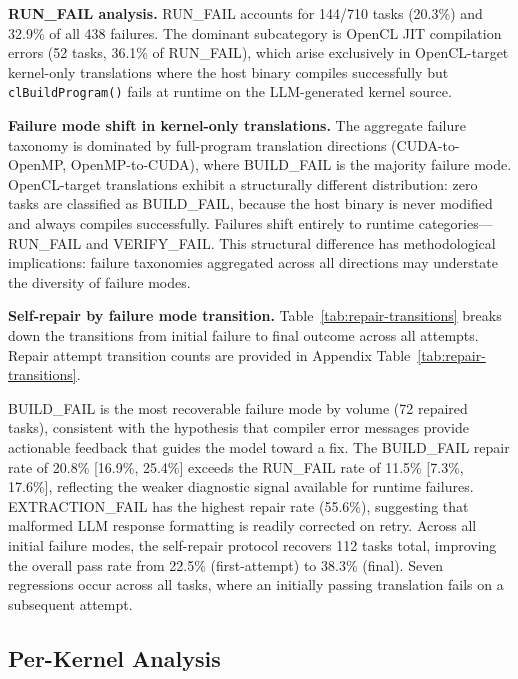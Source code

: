 \documentclass{article}
\newcommand{\buildfail}{\textsc{BUILD\_FAIL}}
\newcommand{\runfail}{\textsc{RUN\_FAIL}}
\newcommand{\verifyfail}{\textsc{VERIFY\_FAIL}}
\newcommand{\extractionfail}{\textsc{EXTRACTION\_FAIL}}
\begin{document}
\textbf{\runfail{} analysis.} \runfail{} accounts for 144/710 tasks (20.3\%) and 32.9\% of all 438 failures. The dominant subcategory is OpenCL JIT compilation errors (52 tasks, 36.1\% of \runfail{}), which arise exclusively in OpenCL-target kernel-only translations where the host binary compiles successfully but \texttt{clBuildProgram()} fails at runtime on the LLM-generated kernel source.

\textbf{Failure mode shift in kernel-only translations.} The aggregate failure taxonomy is dominated by full-program translation directions (CUDA-to-OpenMP, OpenMP-to-CUDA), where \buildfail{} is the majority failure mode. OpenCL-target translations exhibit a structurally different distribution: zero tasks are classified as \buildfail{}, because the host binary is never modified and always compiles successfully. Failures shift entirely to runtime categories---\runfail{} and \verifyfail{}. This structural difference has methodological implications: failure taxonomies aggregated across all directions may understate the diversity of failure modes.

\textbf{Self-repair by failure mode transition.} Table~\ref{tab:repair-transitions} breaks down the transitions from initial failure to final outcome across all attempts.
Repair attempt transition counts are provided in Appendix Table~\ref{tab:repair-transitions}.


\buildfail{} is the most recoverable failure mode by volume (72 repaired tasks), consistent with the hypothesis that compiler error messages provide actionable feedback that guides the model toward a fix. The \buildfail{} repair rate of 20.8\% [16.9\%, 25.4\%] exceeds the \runfail{}{} rate of 11.5\% [7.3\%, 17.6\%], reflecting the weaker diagnostic signal available for runtime failures. \extractionfail{} has the highest repair rate (55.6\%), suggesting that malformed LLM response formatting is readily corrected on retry. Across all initial failure modes, the self-repair protocol recovers 112 tasks total, improving the overall pass rate from 22.5\% (first-attempt) to 38.3\% (final). Seven regressions occur across all tasks, where an initially passing translation fails on a subsequent attempt.

\subsection{Per-Kernel Analysis}
\label{sec:per-kernel}
\end{document}
